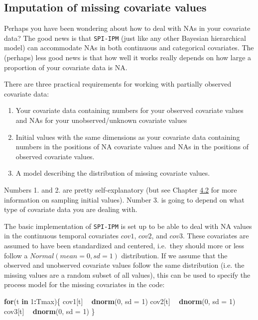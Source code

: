 \documentclass[
]{book}
\newenvironment{Shaded}{\begin{snugshade}}{\end{snugshade}}
\newcommand{\ControlFlowTok}[1]{\textcolor[rgb]{0.13,0.29,0.53}{\textbf{#1}}}
\newcommand{\DataTypeTok}[1]{\textcolor[rgb]{0.13,0.29,0.53}{#1}}
\newcommand{\DecValTok}[1]{\textcolor[rgb]{0.00,0.00,0.81}{#1}}
\newcommand{\KeywordTok}[1]{\textcolor[rgb]{0.13,0.29,0.53}{\textbf{#1}}}
\newcommand{\NormalTok}[1]{#1}
\newcommand{\OperatorTok}[1]{\textcolor[rgb]{0.81,0.36,0.00}{\textbf{#1}}}
\newcommand{\StringTok}[1]{\textcolor[rgb]{0.31,0.60,0.02}{#1}}
\begin{document}
\hypertarget{imputation-of-missing-covariate-values}{%
\subsection{Imputation of missing covariate values}\label{imputation-of-missing-covariate-values}}

Perhaps you have been wondering about how to deal with NAs in your covariate
data? The good news is that \texttt{SPI-IPM} (just like any other Bayesian
hierarchical model) can accommodate NAs in both continuous and categorical
covariates. The (perhaps) less good news is that how well it works really
depends on how large a proportion of your covariate data is NA.

There are three practical requirements for working with partially observed
covariate data:

\begin{enumerate}
\def\labelenumi{\arabic{enumi}.}
\item
  Your covariate data containing numbers for your observed covariate values and NAs for your unobserved/unknown covariate values
\item
  Initial values with the same dimensions as your covariate data containing
  numbers in the positions of NA covariate values and NAs in the positions of
  observed covariate values.
\item
  A model describing the distribution of missing covariate values.
\end{enumerate}

Numbers 1. and 2. are pretty self-explanatory (but see Chapter \protect\hyperlink{ux5cux23ux5cux2520Simulationux5cux2520ofux5cux2520initialux5cux2520values}{4.2} for more information on sampling initial values).
Number 3. is going to depend on what type of covariate data you are dealing with.

The basic implementation of \texttt{SPI-IPM} is set up to be able to deal with NA
values in the continuous temporal covariates \(cov1\), \(cov2\), and \(cov3\). These
covariates are assumed to have been standardized and centered, i.e.~they should
more or less follow a \(Normal(mean= 0, sd = 1)\) distribution. If we assume that
the observed and unobserved covariate values follow the same distribution (i.e.
the missing values are a random subset of all values), this can be used to
specify the process model for the missing covariates in the code:

\begin{Shaded}
\begin{Highlighting}[]
\ControlFlowTok{for}\NormalTok{(t }\ControlFlowTok{in} \DecValTok{1}\OperatorTok{:}\NormalTok{Tmax)\{}
\NormalTok{  cov1[t] }\OperatorTok{~}\StringTok{ }\KeywordTok{dnorm}\NormalTok{(}\DecValTok{0}\NormalTok{, }\DataTypeTok{sd =} \DecValTok{1}\NormalTok{)}
\NormalTok{  cov2[t] }\OperatorTok{~}\StringTok{ }\KeywordTok{dnorm}\NormalTok{(}\DecValTok{0}\NormalTok{, }\DataTypeTok{sd =} \DecValTok{1}\NormalTok{)}
\NormalTok{  cov3[t] }\OperatorTok{~}\StringTok{ }\KeywordTok{dnorm}\NormalTok{(}\DecValTok{0}\NormalTok{, }\DataTypeTok{sd =} \DecValTok{1}\NormalTok{)}
\NormalTok{\}}
\end{Highlighting}
\end{Shaded}
\end{document}
